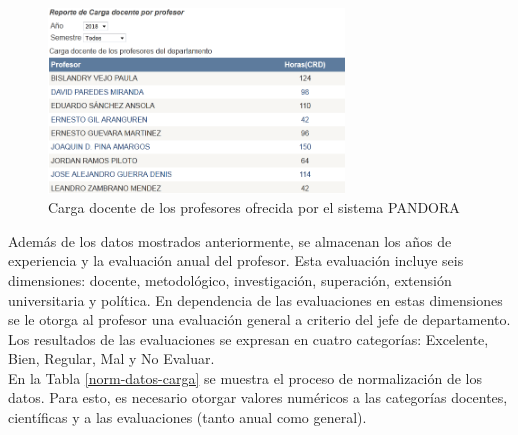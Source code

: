 \begin{figure} [H]
	\centering
	\includegraphics[width=0.7\textwidth]{figuras/HorasProfesor.png}
	\caption{Carga docente de los profesores ofrecida por el sistema PANDORA} \label{horas-prof}
\end{figure}

Además de los datos mostrados anteriormente, se almacenan los años de experiencia y la evaluación anual del profesor. Esta evaluación incluye seis dimensiones: docente, metodológico, investigación, superación, extensión universitaria y política. En dependencia de las evaluaciones en estas dimensiones se le otorga al profesor una evaluación general a criterio del jefe de departamento. Los resultados de las evaluaciones se expresan en cuatro categorías: Excelente, Bien, Regular, Mal y No Evaluar. \\

En la Tabla \ref{norm-datos-carga} se muestra el proceso de normalización de los datos. Para esto, es necesario otorgar valores numéricos a las categorías docentes, científicas y a las evaluaciones (tanto anual como general). 

